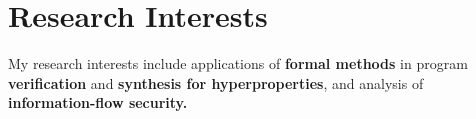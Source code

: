 

\section{Research Interests}

My research interests include applications of {\bf formal methods} in program {\bf verification} and 
{\bf synthesis for hyperproperties}, and analysis of {\bf information-flow security.}


